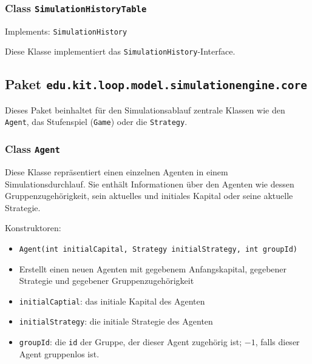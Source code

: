 \documentclass[parskip=full,11pt]{scrartcl}
\begin{document}
\subsubsection{Class \texttt{SimulationHistoryTable}}
Implements: \texttt{SimulationHistory}

Diese Klasse implementiert das \texttt{SimulationHistory}-Interface.

\subsection{Paket \texttt{edu.kit.loop.model.simulationengine.core}}
Dieses Paket beinhaltet für den Simulationsablauf zentrale Klassen wie den \texttt{Agent}, das Stufenspiel (\texttt{Game}) oder die \texttt{Strategy}.

\subsubsection{Class \texttt{Agent}}
Diese Klasse repräsentiert einen einzelnen Agenten in einem Simulationsdurchlauf. Sie enthält Informationen über den Agenten wie dessen Gruppenzugehörigkeit, sein aktuelles und initiales Kapital oder seine aktuelle Strategie.

Konstruktoren:
\begin{itemize}\itemsep -10pt
\item \texttt{Agent(int initialCapital, Strategy initialStrategy, int groupId)}
\item[] Erstellt einen neuen Agenten mit gegebenem Anfangskapital, gegebener Strategie und gegebener Gruppenzugehörigkeit
\item[] \texttt{initialCaptial}: das initiale Kapital des Agenten
\item[] \texttt{initialStrategy}: die initiale Strategie des Agenten
\item[] \texttt{groupId}: die \texttt{id} der Gruppe, der dieser Agent zugehörig ist; \(-1\), falls dieser Agent gruppenlos ist.
\end{itemize}
\end{document}
